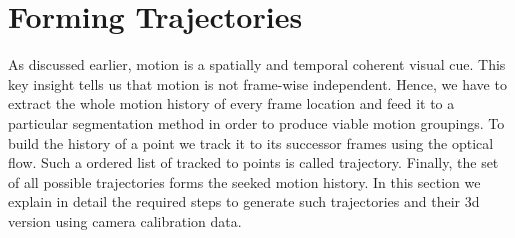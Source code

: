 \section{Forming Trajectories}
As discussed earlier, motion is a spatially and temporal coherent visual cue. This key insight tells us that motion is not frame-wise independent. Hence, we have to extract the whole motion history of every frame location and feed it to a particular segmentation method in order to produce viable motion groupings. To build the history of a point we track it to its successor frames using the optical flow. Such a ordered list of tracked to points is called trajectory. Finally, the set of all possible trajectories forms the seeked motion history. In this section we explain in detail the required steps to generate such trajectories and their 3d version using camera calibration data.

